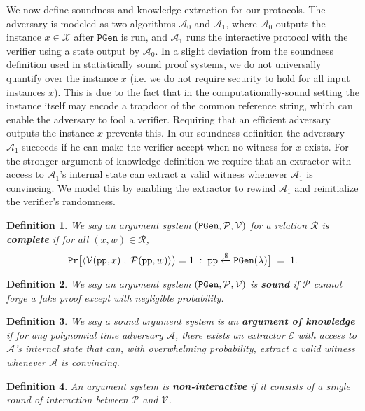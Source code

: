 \documentclass[11pt, lettersize, notitlepage, leqno, footskip=0.6cm]{article}
\newcommand{\ttt}{\texttt}
\newcommand{\mc}{\mathcal}
\newcommand{\lam}{\lambda}
\newcommand{\mP}{\mc{P}}
\newcommand{\A}{\mc{A}}
\newcommand{\V}{\mc{V}}
\newcommand{\vs}{\vspace{-0.15cm}}
\newcommand{\op}{overwhelming probability}
\newcommand{\E}{\mc{E}}
\newtheorem{Def}{Definition}[section]
\numberwithin{equation}{section}
\begin{document}
We now define soundness and knowledge extraction for our protocols. The adversary is modeled as two algorithms $\A_0$ and $\A_1$, where $\A_0$ outputs the instance $x \in \mc{X}$ after $\ttt{PGen}$ is run, and $\A_1$ runs the interactive protocol with the verifier using a state output by $\A_0$. In a slight deviation from the soundness definition used in
statistically sound proof systems, we do not universally quantify over the instance
$x$ (i.e. we do not require security to hold for all input instances $x$). This is due to
the fact that in the computationally-sound setting the instance itself may encode a trapdoor of the common reference string, which can enable the adversary to fool a verifier. Requiring that an efficient adversary outputs the instance $x$ prevents this. In our soundness definition the adversary $\A_1$ succeeds
if he can make the verifier accept when no witness for $x$ exists. For the stronger argument of knowledge definition we require that an extractor with access to $\A_1$'s internal state can extract a valid witness whenever $\A_1$ is convincing. We model this
by enabling the extractor to rewind $\A_1$ and reinitialize the verifier's randomness.



\begin{Def} We say an argument system $(\tt{PGen}, \mP, \V)$ for a relation $\mc{R}$ is \textbf{complete} if for all $(x,w)\in \mc{R}$, \vs $${\tt{Pr}}\big[\langle \V({\tt{pp}}, x)\;,\; \mP({\tt{pp}}, w)\rangle\big) =1\;:\; {\tt{pp}} \xleftarrow{\$} {\tt{PGen}}(\lam) \big]\; = \; 1. $$ \end{Def}

\begin{Def} We say an argument system $({\tt{PGen}}, \mP, \V)$ is \textbf{sound} if $\mP$ cannot forge a fake proof except with negligible probability. \end{Def}

\begin{Def} We say a sound argument system is an \textbf{argument of knowledge} if for any polynomial time adversary $\A$, there exists an extractor $\E$ with access to $\A$'s internal state that can, with \op, extract a valid witness whenever $\A$ is convincing. \end{Def}

\begin{Def} An argument system is \textbf{non-interactive} if it consists of a single round of interaction between $\mP$ and $\V$.\end{Def}
\end{document}
